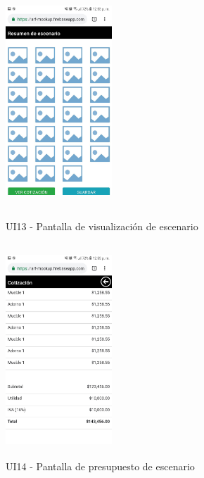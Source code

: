 \begin{figure}[h!]
	\begin{minipage}{0.48\textwidth}
		\centering
		\includegraphics[width=4cm,height=8cm]{imagenes/Anexos/Mockup/escenario.jpg}
		\caption{UI13 - Pantalla de visualización de escenario}
		\label{fig:viewesc}
	\end{minipage}\hfill
	\begin{minipage}{0.48\textwidth}
		\centering
		\includegraphics[width=4cm,height=8cm]{imagenes/Anexos/Mockup/presupuesto.jpg}
		\caption{UI14 - Pantalla de presupuesto de escenario}
		\label{fig:presupuesto} 
	\end{minipage}\hfill
\end{figure}